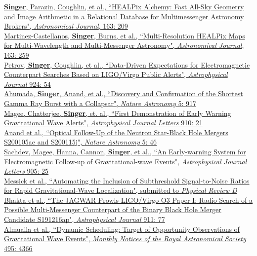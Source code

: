 \documentclass[10pt, letterpaper]{article} %
\newcommand{\years}[1]{\marginnote{\scriptsize #1}} %
\begin{document}
\years{2022}\href{https://doi.org/10.3847/1538-3881/ac5ab8}{\textbf{Singer}, Parazin, Coughlin, et al., “HEALPix Alchemy: Fast All-Sky Geometry and Image Arithmetic in a Relational Database for Multimessenger Astronomy Brokers", \emph{Astronomical Journal}, 163: 209}\\[0.125cm]
%
\years{2022}\href{https://doi.org/10.3847/1538-3881/ac6260}{Martinez-Castellanos, \textbf{Singer}, Burns, et al., “Multi-Resolution HEALPix Maps for Multi-Wavelength and Multi-Messenger Astronomy", \emph{Astronomical Journal}, 163: 259}\\[0.125cm]
%
\years{2022}\href{https://doi.org/10.3847/1538-4357/ac366d}{Petrov, \textbf{Singer}, Coughlin, et al., “Data-Driven Expectations for Electromagnetic Counterpart Searches Based on LIGO/Virgo Public Alerts", \emph{Astrophysical Journal} 924: 54}\\[0.125cm]
%
\years{2021}\href{https://doi.org/10.1038/s41550-021-01428-7}{Ahumada, \textbf{Singer}, Anand, et al., “Discovery and Confirmation of the Shortest Gamma Ray Burst with a Collapsar", \emph{Nature Astronomy} 5: 917}\\[0.125cm]
%
\years{2021}\href{https://doi.org/10.3847/2041-8213/abed54}{Magee, Chatterjee, \textbf{Singer}, et. al., “First Demonstration of Early Warning Gravitational Wave Alerts", \emph{Astrophysical Journal Letters} 910: 21}\\[0.125cm]
%
\years{2021}\href{https://doi.org/10.1038/s41550-020-1183-3}{Anand et al., “Optical Follow-Up of the Neutron Star-Black Hole Mergers S200105ae and S200115j", \emph{Nature Astronomy} 5: 46}\\[0.125cm]
%
\years{2020}\href{https://doi.org/10.3847/2041-8213/abc753}{Sachdev, Magee, Hanna, Cannon, \textbf{Singer}, et al., “An Early-warning System for Electromagnetic Follow-up of Gravitational-wave Events", \emph{Astrophysical Journal Letters} 905: 25}\\[0.125cm]
%
\years{2020}\href{https://arxiv.org/abs/2011.02457}{Messick et al., “Automating the Inclusion of Subthreshold Signal-to-Noise Ratios for Rapid Gravitational-Wave Localization", submitted to \emph{Physical Review D}}\\[0.125cm]
%
\years{2020}\href{https://doi.org/10.3847/1538-4357/abeaa8}{Bhakta et al., “The JAGWAR Prowls LIGO/Virgo O3 Paper I: Radio Search of a Possible Multi-Messenger Counterpart of the Binary Black Hole Merger Candidate S191216ap", \emph{Astrophysical Journal} 911: 77}\\[0.125cm]
%
\years{2020}\href{https://doi.org/10.1093/mnras/staa1498}{Almualla et al., “Dynamic Scheduling: Target of Opportunity Observations of Gravitational Wave Events", \emph{Monthly Notices of the Royal Astronomical Society} 495: 4366}\\[0.125cm]
\end{document}
